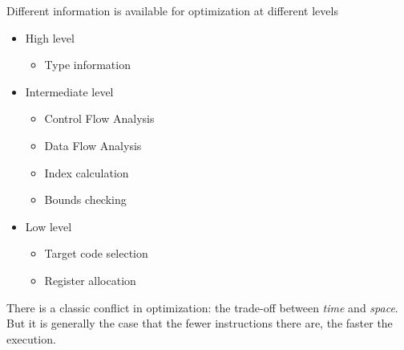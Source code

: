 \begin{definition}
    Different information is available for optimization at different levels
    \begin{itemize}
        \item High level
        \begin{itemize}
            \item Type information
        \end{itemize}
        \item Intermediate level
        \begin{itemize}
            \item Control Flow Analysis
            \item Data Flow Analysis
            \item Index calculation
            \item Bounds checking
        \end{itemize}
        \item Low level
        \begin{itemize}
            \item Target code selection
            \item Register allocation
        \end{itemize}
    \end{itemize}
\end{definition}

\begin{remark}
    There is a classic conflict in optimization: the trade-off between \textit{time} and \textit{space}. But it is generally the case that the fewer instructions there are, the faster the execution.
\end{remark}

